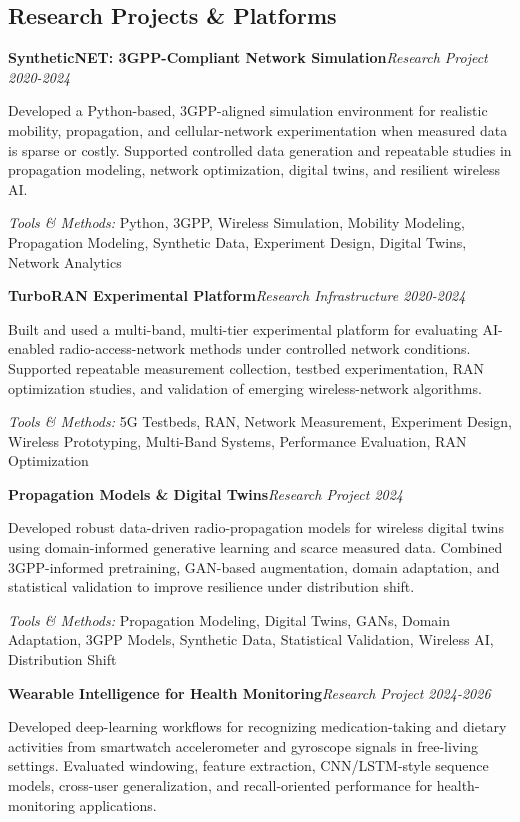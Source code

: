 \documentclass[10pt,letterpaper]{extarticle}
\newcommand{\entry}[2]{\Needspace{4\baselineskip}\textbf{#1}\hfill\textit{#2}\par}
\begin{document}
\subsection{Research Projects \& Platforms}
\entry{SyntheticNET: 3GPP-Compliant Network Simulation}{Research Project \textbar{} 2020-2024}
Developed a Python-based, 3GPP-aligned simulation environment for realistic mobility, propagation, and cellular-network experimentation when measured data is sparse or costly. Supported controlled data generation and repeatable studies in propagation modeling, network optimization, digital twins, and resilient wireless AI.\par
{\small\textit{Tools \& Methods:} Python, 3GPP, Wireless Simulation, Mobility Modeling, Propagation Modeling, Synthetic Data, Experiment Design, Digital Twins, Network Analytics\par}
\vspace{1pt}
\entry{TurboRAN Experimental Platform}{Research Infrastructure \textbar{} 2020-2024}
Built and used a multi-band, multi-tier experimental platform for evaluating AI-enabled radio-access-network methods under controlled network conditions. Supported repeatable measurement collection, testbed experimentation, RAN optimization studies, and validation of emerging wireless-network algorithms.\par
{\small\textit{Tools \& Methods:} 5G Testbeds, RAN, Network Measurement, Experiment Design, Wireless Prototyping, Multi-Band Systems, Performance Evaluation, RAN Optimization\par}
\vspace{1pt}
\entry{Propagation Models \& Digital Twins}{Research Project \textbar{} 2024}
Developed robust data-driven radio-propagation models for wireless digital twins using domain-informed generative learning and scarce measured data. Combined 3GPP-informed pretraining, GAN-based augmentation, domain adaptation, and statistical validation to improve resilience under distribution shift.\par
{\small\textit{Tools \& Methods:} Propagation Modeling, Digital Twins, GANs, Domain Adaptation, 3GPP Models, Synthetic Data, Statistical Validation, Wireless AI, Distribution Shift\par}
\vspace{1pt}
\entry{Wearable Intelligence for Health Monitoring}{Research Project \textbar{} 2024-2026}
Developed deep-learning workflows for recognizing medication-taking and dietary activities from smartwatch accelerometer and gyroscope signals in free-living settings. Evaluated windowing, feature extraction, CNN/LSTM-style sequence models, cross-user generalization, and recall-oriented performance for health-monitoring applications.\par
\end{document}
